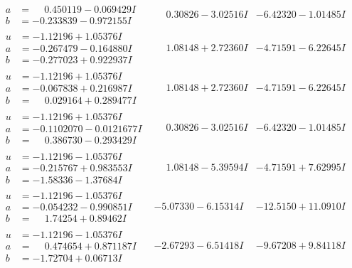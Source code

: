 \documentclass[1p]{elsarticle_modified}
\theoremstyle{definition}
\begin{document}
$$\begin{array}{c|c|c}
\begin{aligned}
a &= \phantom{-}0.450119 - 0.069429 I \\
b &= -0.233839 - 0.972155 I\end{aligned}
 & \phantom{-}0.30826 - 3.02516 I & -6.42320 - 1.01485 I \\ \hline\begin{aligned}
u &= -1.12196 + 1.05376 I \\
a &= -0.267479 - 0.164880 I \\
b &= -0.277023 + 0.922937 I\end{aligned}
 & \phantom{-}1.08148 + 2.72360 I & -4.71591 - 6.22645 I \\ \hline\begin{aligned}
u &= -1.12196 + 1.05376 I \\
a &= -0.067838 + 0.216987 I \\
b &= \phantom{-}0.029164 + 0.289477 I\end{aligned}
 & \phantom{-}1.08148 + 2.72360 I & -4.71591 - 6.22645 I \\ \hline\begin{aligned}
u &= -1.12196 + 1.05376 I \\
a &= -0.1102070 - 0.0121677 I \\
b &= \phantom{-}0.386730 - 0.293429 I\end{aligned}
 & \phantom{-}0.30826 - 3.02516 I & -6.42320 - 1.01485 I \\ \hline\begin{aligned}
u &= -1.12196 - 1.05376 I \\
a &= -0.215767 + 0.983553 I \\
b &= -1.58336 - 1.37684 I\end{aligned}
 & \phantom{-}1.08148 - 5.39594 I & -4.71591 + 7.62995 I \\ \hline\begin{aligned}
u &= -1.12196 - 1.05376 I \\
a &= -0.054232 - 0.990851 I \\
b &= \phantom{-}1.74254 + 0.89462 I\end{aligned}
 & -5.07330 - 6.15314 I & -12.5150 + 11.0910 I \\ \hline\begin{aligned}
u &= -1.12196 - 1.05376 I \\
a &= \phantom{-}0.474654 + 0.871187 I \\
b &= -1.72704 + 0.06713 I\end{aligned}
 & -2.67293 - 6.51418 I & -9.67208 + 9.84118 I \\ \hline\begin{aligned}

\end{aligned}
\end{array}$$
\end{document}
